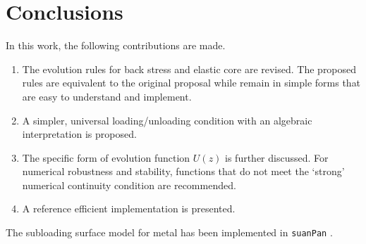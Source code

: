 
\section{Conclusions}
In this work, the following contributions are made.
\begin{enumerate}
    \item The evolution rules for back stress and elastic core are revised.
          The proposed rules are equivalent to the original proposal while remain in simple forms that are easy to understand and implement.
    \item A simpler, universal loading/unloading condition with an algebraic interpretation is proposed.
    \item The specific form of evolution function $U\left(z\right)$ is further discussed.
          For numerical robustness and stability, functions that do not meet the `strong' numerical continuity condition are recommended.
    \item A reference efficient implementation is presented.
\end{enumerate}

The subloading surface model for metal has been implemented in \texttt{suanPan} \citep{Chang2022}.